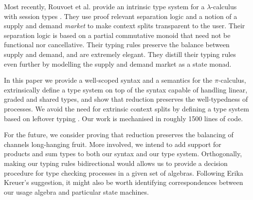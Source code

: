 \documentclass[a4paper,UKenglish,cleveref,autoref,thm-restate,authorcolumns]{lipics-v2019}
\theoremstyle{definition}
\newcommand{\lambdacalc}{$\lambda$-calculus}
\newcommand{\picalc}{$\pi$-calculus}
\begin{document}
Most recently, Rouvoet et al. provide an intrinsic type system for a \lambdacalc{} with session types \cite{Rouvoet2020}.
They use proof relevant separation logic and a notion of a supply and demand \emph{market} to make context splits transparent to the user.
Their separation logic is based on a partial commutative monoid that need not be functional nor cancellative.
Their typing rules preserve the balance between supply and demand, and are extremely elegant.
They distill their typing rules even further by modelling the supply and demand market as a state monad.


In this paper we provide a well-scoped syntax and a semantics for the \picalc{}, extrinsically define a type system on top of the syntax capable of handling linear, graded and shared types, and show that reduction preserves the well-typedness of processes.
We avoid the need for extrinsic context splits by defining a type system based on leftover typing \cite{Allais2018a}.
Our work is mechanised in roughly 1500 lines of code.

For the future, we consider proving that reduction preserves the balancing of channels long-hanging fruit.
More involved, we intend to add support for products and sum types to both our syntax and our type system.
Orthogonally, making our typing rules bidirectional would allows us to provide a decision procedure for type checking processes in a given set of algebras.
Following Erika Kreuer's suggestion, it might also be worth identifying correspondences between our usage algebra and particular state machines.

\newpage


\newpage
\appendix

\end{document}
